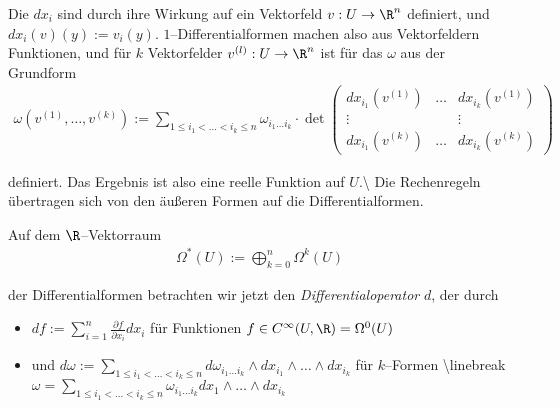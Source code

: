 \documentclass[letterpaper,10pt,english]{jupyterBook}
\begin{document}
\par
Die \(dx_i\) sind durch ihre Wirkung auf ein Vektorfeld \(v:U\to
\R^n\) definiert, und \(dx_i(v)( y) := v_i( y)\).
\(1\)–Differentialformen machen also aus Vektorfeldern Funktionen, und für \(k\) Vektorfelder \(v^{(l)}:U\to\R^n\) ist für das \(\omega\) aus der Grundform
\begin{align*}
\omega\left(v^{(1)},\ldots,v^{(k)}\right) := \sum_{1\leq i_1<\ldots<i_k\leq n}
\omega_{i_1\ldots i_k}\cdot\det\begin{pmatrix} dx_{i_1}(v^{(1)})&\ldots& dx_{i_k}(v^{(1)})\\
\vdots&&\vdots\\
dx_{i_1}(v^{(k)})&\ldots& dx_{i_k}(v^{(k)}) \end{pmatrix}
\end{align*}
\par
definiert. Das Ergebnis ist also eine reelle Funktion auf \(U\).\textbackslash{}
Die Rechenregeln übertragen sich von den äußeren Formen auf die Differentialformen.

\par
Auf dem \(\R\)–Vektorraum
\begin{align*}
\Omega^*(U) := \bigoplus_{k=0}^n\Omega^k(U)
\end{align*}
\par
der Differentialformen betrachten wir jetzt
den \emph{Differentialoperator} \(d\), der durch
\begin{itemize}
\item {} 
\par
\(df := \sum_{i=1}^n\frac{\partial f}{\partial x_i}dx_i\) für Funktionen
\(f\in C^\infty(U,\R) = \Omega^0(U)\)

\item {} 
\par
und \(d\omega := \sum_{1\leq i_1<\ldots<i_k\leq n}d\omega_{i_1\ldots i_k}
\wedge dx_{i_1}\wedge\ldots\wedge dx_{i_k}\) für \(k\)–Formen \textbackslash{}linebreak
\(\omega = \sum_{1\leq i_1<\ldots<i_k\leq n}\omega_{i_1\ldots i_k}
dx_1\wedge\ldots\wedge dx_{i_k}\)

\end{itemize}
\end{document}
